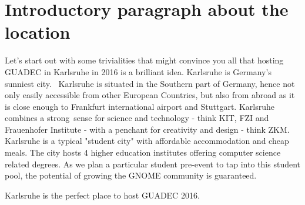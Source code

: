 \section{Introductory paragraph about the location}

Let's start out with some trivialities that might convince you all that hosting GUADEC in Karlsruhe in 2016 is a brilliant idea. Karlsruhe is Germany's sunniest city.  Karlsruhe is situated in the Southern part of Germany, hence not only easily accessible from other European Countries, but also from abroad as it is close enough to Frankfurt international airport and Stuttgart. Karlsruhe combines a strong sense for science and technology - think KIT, FZI and Frauenhofer Institute - with a penchant for creativity and design - think ZKM. Karlsruhe is a typical "student city" with affordable accommodation and cheap meals. The city hosts 4 higher education institutes offering computer science related degrees. As we plan a particular student pre-event to tap into this student pool, the potential of growing the GNOME community is guaranteed.  

Karlsruhe is the perfect place to host GUADEC 2016. 

